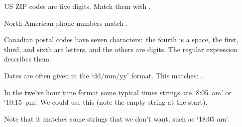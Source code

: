 \documentclass[9pt,t,serif,professionalfont,xcolor={table,dvipsnames},noamsthm]{beamer}
\begin{document}
\begin{frame}
\begin{example}
US ZIP codes are five digits.
Match them with
.
\end{example}

\begin{example} \label{ex:NAPhoneNumber}
North American phone numbers match
.
\end{example}

\begin{example}  \label{ex:CanadianPostCodes}
Canadian postal codes have seven characters:~the fourth is a space,
the first, third, and sixth are letters, and
the others are digits.
The regular expression
describes them.
\end{example}

\begin{example}
Dates are often given in the `dd/mm/yy' format.
This matches:
.
\end{example}

\begin{example} \label{ex:AmerTime}
In the twelve hour time format some typical times
strings are `8:05~am' or `10:15~pm'.
We could use this (note the empty string at the start).
\begin{center}
\end{center}
Note that it matches some strings that we don't want, 
such as `18:05 am'. 
\end{example}
\end{frame}
\end{document}
